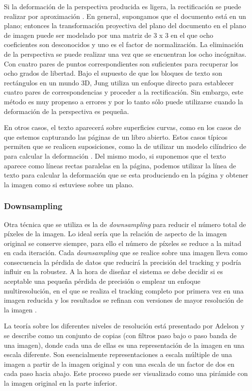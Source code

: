 Si la deformación de la perspectiva producida es ligera, la rectificación se puede realizar por aproximación \cite{Hsieh}. En general, supongamos que el documento está en un plano; entonces la transformación proyectiva del plano del documento en el plano de imagen puede ser modelado por una matriz de 3 x 3 en el que ocho coeficientes son desconocidos y uno es el factor de normalización. La eliminación de la perspectiva se puede realizar una vez que se encuentran los ocho incógnitas. Con cuatro pares de puntos correspondientes son suficientes para recuperar los ocho grados de libertad. Bajo el supuesto de que los bloques de texto son rectángulos en un mundo 3D, Jung \cite{Jung}  utiliza un enfoque directo para establecer cuatro pares de correspondencias y proceder a la rectificación. Sin embargo, este método es muy propenso a errores y por lo tanto sólo puede utilizarse cuando la deformación de la perspectiva es pequeña.

En otros casos, el texto aparecerá sobre superficies curvas, como en los casos de que estemos capturando las páginas de un libro abierto. Estos casos típicos permiten que se realicen suposiciones, como la de utilizar un modelo cilíndrico de para calcular la deformación \cite{Kanungo}. Del mismo modo, si suponemos que el texto aparece como líneas rectas paralelas en la página, podemos utilizar la línea de texto para calcular la deformación que se esta produciendo en la página y obtener la imagen como si estuviese sobre un plano.

\subsubsection{Downsampling}
Otra técnica que se utiliza es la de \emph{downsampling} para reducir el número total de píxeles de la imagen. Lo ideal sería que la relación de aspecto de la imagen original se conserve siempre, para ello el número de píxeles se reduce a la mitad en cada iteración. Cada \emph{downsampling} que se realice sobre una imagen lleva como consecuencia la pérdida de datos que reducirá la precisión del tracking y podría influir en la robustez. A la hora de diseñar el sistema se debe decidir si es aceptable una pequeña pérdida de precisión o emplear un enfoque multiresolución, en el que se realiza el tracking completo por primera vez en una imagen reducida y los resultados se refinan con versiones de mayor resolución de la imagen \cite{Klein}.

La teoría sobre los diferentes niveles de resolución está presentado por Adelson \cite{Adelson} y se describe como un conjunto de copias (con filtros paso bajo o paso banda de una imagen), donde cada una de ellas es una representación de la imagen en una escala diferente. Son esencialmente representaciones a escala múltiple de una imagen a partir de la imagen original y con una escala de un factor de dos en cada paso hacia abajo. Este proceso puede ser visualizado como una pirámide con la imagen original en la parte inferior. 

